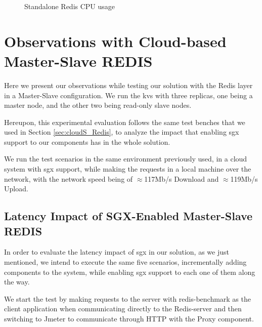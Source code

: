 \begin{figure}[htbp]
	\centering
	\caption{Standalone Redis CPU usage}
	\label{fig:cpuUsageStandalone}
\end{figure}

\section{Observations with Cloud-based Master-Slave REDIS}
\label{sec:cloud_MS_Redis}

Here we present our observations while testing our solution with the Redis layer in a Master-Slave configuration. We run the \gls{kvs} with three replicas, one being a master node, and the other two being read-only slave nodes. 

Hereupon, this experimental evaluation follows the same test benches that we used in Section \ref{sec:cloudS_Redis}, to analyze the impact that enabling \gls{sgx} support to our components has in the whole solution.

We run the test scenarios in the same environment previously used, in a cloud system with \gls{sgx} support, while making the requests in a local machine over the network, with the network speed being of $\approx$117Mb/s Download and $\approx$119Mb/s Upload.


\subsection{Latency Impact of SGX-Enabled Master-Slave REDIS}

In order to evaluate the latency impact of \gls{sgx} in our solution, as we just mentioned, we intend to execute the same five scenarios, incrementally adding components to the system, while enabling \gls{sgx} support to each one of them along the way. 

We start the test by making requests to the server with redis-benchmark as the client application when communicating directly to the Redis-server and then switching to Jmeter to communicate through HTTP with the Proxy component.

